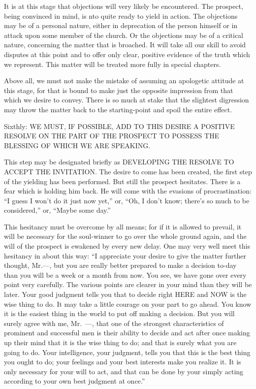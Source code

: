 \documentclass[
]{book}
\begin{document}
It is at this stage that objections will very likely be encountered. The prospect, being convinced in mind, is nto quite ready to yield in action. The objections may be of a personal nature, either in deprecation of the person himself or in attack upon some member of the church. Or the objections may be of a critical nature, concerning the matter that is broached. It will take all our skill to avoid disputes at this point and to offer only clear, positive evidence of the truth which we represent. This matter will be treated more fully in special chapters.

Above all, we must not make the mistake of assuming an apologetic attitude at this stage, for that is bound to make just the opposite impression from that which we desire to convey. There is so much at stake that the slightest digression may throw the matter back to the starting-point and spoil the entire effect.

Sixthly: WE MUST, IF POSSIBLE, ADD TO THIS DESIRE A POSITIVE RESOLVE ON THE PART OF THE PROSPECT TO POSSESS THE BLESSING OF WHICH WE ARE SPEAKING.

This step may be designated briefly as DEVELOPING THE RESOLVE TO ACCEPT THE INVITATION. The desire to come has been created, the first step of the yielding has been performed. But still the prospect hesitates. There is a fear which is holding him back. He will come with the evasions of procrastination: ``I guess I won't do it just now yet,'' or, ``Oh, I don't know; there's so much to be considered,'' or, ``Maybe some day.''

This hesitancy must be overcome by all means; for if it is allowed to prevail, it will be necessary for the soul-winner to go over the whole ground again, and the will of the prospect is ewakened by every new delay. One may very well meet this hesitancy in about this way: ``I appreciate your desire to give the matter further thought, Mr.---, but you are really better prepared to make a decision to-day than you will be a week or a month from now. You see, we have gone over every point very carefully. The various points are clearer in your mind than they will be later. Your good judgment tells you that to decide right HERE and NOW is the wise thing to do. It may take a little courage on your part to go ahead. You know it is the easiest thing in the world to put off making a decision. But you will surely agree with me, Mr.~---, that one of the strongest characteristics of prominent and successful men is their ability to decide and act after once making up their mind that it is the wise thing to do; and that is surely what you are going to do. Your intelligence, your judgment, tells you that this is the best thing you ought to do; your feelings and your best interests make you realize it. It is only necessary for your will to act, and that can be done by your simply acting according to your own best judgment at once.''
\end{document}
